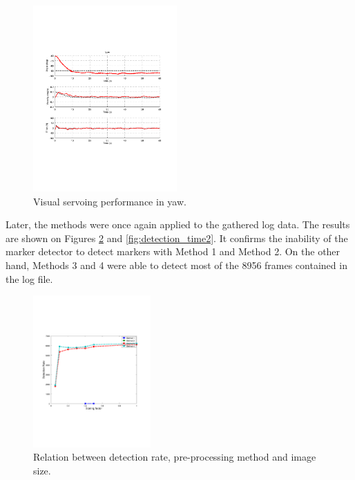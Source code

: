 \documentclass[conference, letterpaper]{IEEEtran}
\begin{document}
\begin{figure}[!ht]
	\centering
    \includegraphics[width=0.49\textwidth, trim={1.6cm 6.9cm 2.3cm 6.7cm}]{./fig/vs_yaw_emb.pdf}
    \caption{Visual servoing performance in yaw.}
	\label{fig:vs_yaw}
\end{figure}

Later, the methods were once again applied to the gathered log data. The results are shown
on Figures \ref{fig:detection_rate2} and \ref{fig:detection_time2}. It confirms
the inability of the marker detector to detect markers with Method 1 and
Method 2. On the other hand, Methods 3 and 4 were able to detect most of the
8956 frames contained in the log file. 

\begin{figure}[!ht]
	\centering
    \includegraphics[width=0.4\textwidth, trim={1.6cm 6.9cm 2.3cm 6.7cm}]{./fig/detection_rate2_emb.pdf}
    \caption{Relation between detection rate, pre-processing method and image size.}
	\label{fig:detection_rate2}
\end{figure}
\end{document}
